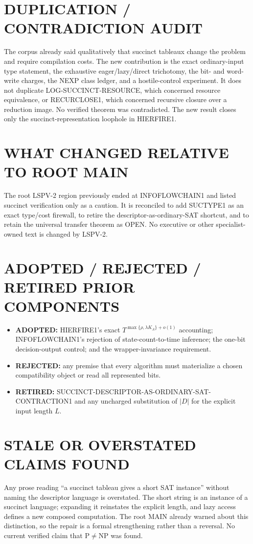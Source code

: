 \documentclass[11pt]{article}
\begin{document}
\section*{DUPLICATION / CONTRADICTION AUDIT}
The corpus already said qualitatively that succinct tableaux change the
problem and require compilation costs.  The new contribution is the exact
ordinary-input type statement, the exhaustive eager/lazy/direct trichotomy,
the bit- and word-write charges, the NEXP class ledger, and a hostile-control
experiment.  It does not duplicate LOG-SUCCINCT-RESOURCE, which concerned
resource equivalence, or RECURCLOSE1, which concerned recursive closure over a
reduction image.  No verified theorem was contradicted.  The new result closes
only the succinct-representation loophole in HIERFIRE1.

\section*{WHAT CHANGED RELATIVE TO ROOT MAIN}
The root LSPV-2 region previously ended at INFOFLOWCHAIN1 and listed succinct
verification only as a caution.  It is reconciled to add SUCTYPE1 as an exact
type/cost firewall, to retire the descriptor-as-ordinary-SAT shortcut, and to
retain the universal transfer theorem as OPEN.  No executive or other
specialist-owned text is changed by LSPV-2.

\section*{ADOPTED / REJECTED / RETIRED PRIOR COMPONENTS}
\begin{itemize}
\item \textbf{ADOPTED:} HIERFIRE1's exact
$T^{\max\{\rho,\lambda K_A\}+o(1)}$ accounting; INFOFLOWCHAIN1's rejection of
state-count-to-time inference; the one-bit decision-output control; and the
wrapper-invariance requirement.
\item \textbf{REJECTED:} any premise that every algorithm must materialize a
chosen compatibility object or read all represented bits.
\item \textbf{RETIRED:} SUCCINCT-DESCRIPTOR-AS-ORDINARY-SAT-CONTRACTION1 and
any uncharged substitution of $|D|$ for the explicit input length $L$.
\end{itemize}

\section*{STALE OR OVERSTATED CLAIMS FOUND}
Any prose reading ``a succinct tableau gives a short SAT instance'' without
naming the descriptor language is overstated.  The short string is an instance
of a succinct language; expanding it reinstates the explicit length, and lazy
access defines a new composed computation.  The root MAIN already warned about
this distinction, so the repair is a formal strengthening rather than a
reversal.  No current verified claim that P$\ne$NP was found.
\end{document}
